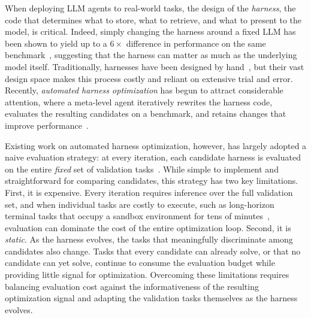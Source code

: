 \documentclass{article} %
\begin{document}
When deploying LLM agents to real-world tasks, the design of the \textit{harness}, the code that determines what to store, what to retrieve, and what to present to the model, is critical. Indeed, simply changing the harness around a fixed LLM has been shown to yield up to a $6\times$ difference in performance on the same benchmark~\citep{Tian2026SWEBenchMC}, suggesting that the harness can matter as much as the underlying model itself. Traditionally, harnesses have been designed by hand~\citep{zhang2025ace, ye2026meta, merrill2026terminal, terminuskira2026}, but their vast design space makes this process costly and reliant on extensive trial and error. Recently, \emph{automated harness optimization} has begun to attract considerable attention, where a meta-level agent iteratively rewrites the harness code, evaluates the resulting candidates on a benchmark, and retains changes that improve performance~\citep{lee2026meta, lin2026agentic, zhang2026harnessing, wang2026rethinking, guo2026drevo,  weng2026harness}.

Existing work on automated harness optimization, however, has largely adopted a naive evaluation strategy: at every iteration, each candidate harness is evaluated on the entire \emph{fixed} set of validation tasks~\citep{lee2026meta, lin2026agentic, zhang2026harnessing, wang2026rethinking}. While simple to implement and straightforward for comparing candidates, this strategy has two key limitations. First, it is expensive. Every iteration requires inference over the full validation set, and when individual tasks are costly to execute, such as long-horizon terminal tasks that occupy a sandbox environment for tens of minutes~\citep{merrill2026terminal}, evaluation can dominate the cost of the entire optimization loop. Second, it is \emph{static}. As the harness evolves, the tasks that meaningfully discriminate among candidates also change. Tasks that every candidate can already solve, or that no candidate can yet solve, continue to consume the evaluation budget while providing little signal for optimization. Overcoming these limitations requires balancing evaluation cost against the informativeness of the resulting optimization signal and adapting the validation tasks themselves as the harness evolves.
\end{document}
